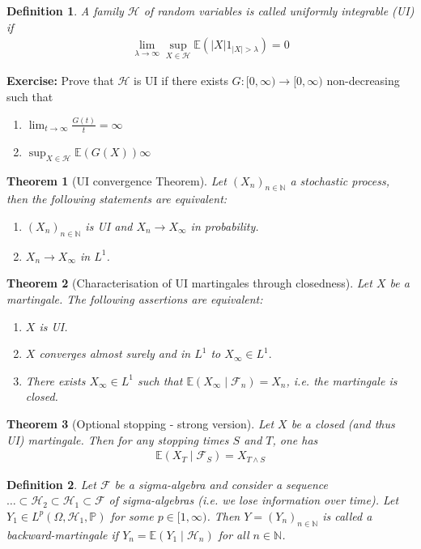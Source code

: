 \documentclass[11pt,a4paper, final]{article}
\newtheorem{thm}{Theorem}[section]
\newtheorem{defn}{Definition}[section]
\theoremstyle{definition}
\begin{document}
\begin{defn} A family $\mathcal{H}$ of random variables is called uniformly integrable (UI) if 
\begin{align*}
\lim_{\lambda \to \infty} \sup_{X \in \mathcal{H}} \mathbb{E}( |X| 1_{|X| > \lambda} ) = 0 
\end{align*}
\end{defn}
\noindent \textbf{Exercise:} Prove that $\mathcal{H}$ is UI if there exists $G: [0, \infty) \to [0, \infty)$ non-decreasing such that 
\begin{enumerate}
\item $\lim_{t \to \infty} \frac{G(t)}{t} = \infty$ 
\item $\sup_{X \in \mathcal{H}} \mathbb{E}(G(X)) \infty$ 
\end{enumerate}
\begin{thm}[UI convergence Theorem] Let $(X_n)_{n \in \mathbb{N}}$ a stochastic process, then the following statements are equivalent:
\begin{enumerate}
\item $(X_n)_{n \in \mathbb{N}}$ is UI and $X_n \to X_\infty$ in probability.
\item $X_n \to X_\infty$ in $L^1$.
\end{enumerate}
\end{thm}
\begin{thm}[Characterisation of UI martingales through closedness] Let $X$ be a martingale. The following assertions are equivalent:
\begin{enumerate}
\item $X$ is UI. 
\item $X$ converges almost surely and in $L^1$ to $X_\infty \in L^1.$ 
\item There exists $X_\infty \in L^1$ such that $\mathbb{E}(X_\infty \mid \mathcal{F}_n) = X_n$, i.e. the martingale is closed. 
\end{enumerate}
\end{thm}
\begin{thm}[Optional stopping - strong version] Let $X$ be a closed (and thus UI) martingale. Then for any stopping times $S$ and $T$, one has 
\begin{align*}
\mathbb{E}(X_T \mid \mathcal{F}_S)= X_{T \wedge S}
\end{align*}
\end{thm}
\newpage
\begin{defn} Let $\mathcal{F}$ be a sigma-algebra and consider a sequence \\ $\dots \subset \mathcal{H}_2 \subset \mathcal{H}_1 \subset \mathcal{F}$ of sigma-algebras (i.e. we lose information over time). Let $Y_1 \in L^p( \Omega, \mathcal{H}_1, \mathbb{P})$ for some $p \in [1, \infty)$. Then $Y=(Y_n)_{n \in \mathbb{N}}$ is called a backward-martingale if $Y_n= \mathbb{E}(Y_1 \mid \mathcal{H}_n)$ for all $n \in \mathbb{N}$. 
\end{defn}
\end{document}
